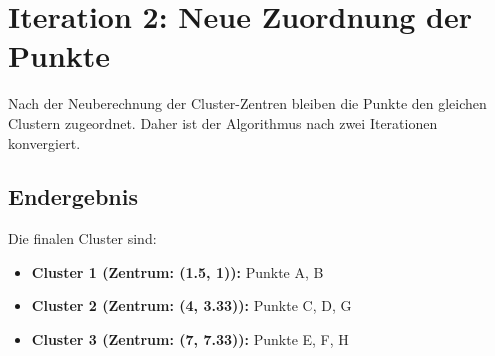 \documentclass{article}
\begin{document}
\section*{Iteration 2: Neue Zuordnung der Punkte}
Nach der Neuberechnung der Cluster-Zentren bleiben die Punkte den gleichen Clustern zugeordnet. Daher ist der Algorithmus nach zwei Iterationen konvergiert.

\subsection*{Endergebnis}
Die finalen Cluster sind:
\begin{itemize}
    \item \textbf{Cluster 1 (Zentrum: (1.5, 1)):} Punkte A, B
    \item \textbf{Cluster 2 (Zentrum: (4, 3.33)):} Punkte C, D, G
    \item \textbf{Cluster 3 (Zentrum: (7, 7.33)):} Punkte E, F, H
\end{itemize}
\end{document}

